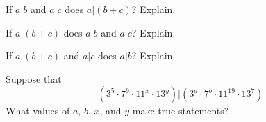 \documentclass{ximera}
\begin{document}
\begin{problem}
If $a|b$ and $a|c$ does $a|(b+c)$?  Explain.  
\end{problem}

\begin{problem}
If $a|(b+c)$ does $a|b$ and $a|c$?  Explain.  
\end{problem}

\begin{problem}
If $a|(b+c)$ and $a|c$ does $a|b$?  Explain.  
\end{problem}

\begin{problem}
Suppose that $$(3^5\cdot 7^9\cdot 11^x\cdot 13^y)|(3^a\cdot 7^b\cdot 11^{19}\cdot 13^7)$$
What values of $a$, $b$, $x$, and $y$ make true statements? 
\end{problem}
\end{document}
